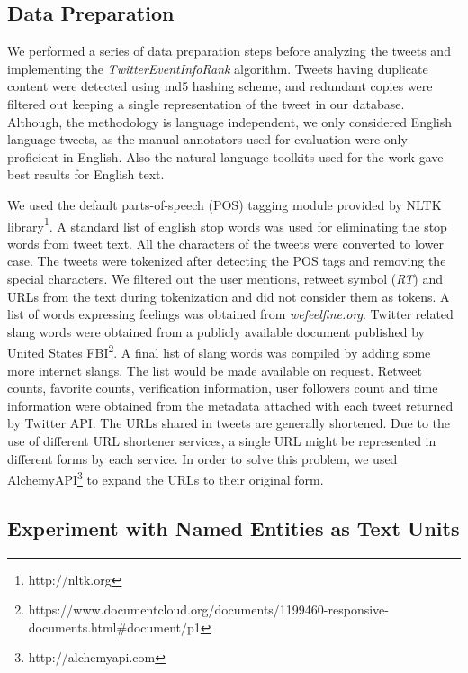 \subsection{Data Preparation\label{dataprep}}
We performed a series of data preparation steps before analyzing the tweets and implementing the \textit{TwitterEventInfoRank} algorithm.  Tweets having duplicate content were detected using md5 hashing scheme, and redundant copies were filtered out keeping a single representation of the tweet in our database. Although, the methodology is language independent,
we only considered English language tweets, as the manual annotators used for evaluation were only proficient in English. Also the natural language toolkits used for the work gave best results for English text. 

We used the default parts-of-speech (POS) tagging module provided by NLTK library\footnote{\tiny http://nltk.org}. A standard list of english stop words was used for eliminating the stop words from tweet text. All the characters of the tweets were converted to lower case. The tweets were tokenized after detecting the POS tags and removing the special characters. We filtered out the user mentions, retweet symbol (\textit{RT}) and URLs from the text during tokenization and did not consider them as tokens. A list of words expressing feelings was obtained from \textit{wefeelfine.org}. Twitter related slang words were obtained from a publicly available document published by United States FBI\footnote{\tiny https://www.documentcloud.org/documents/1199460-responsive-documents.html\#document/p1}. A final list of slang words was compiled 
by adding some more internet slangs. The list would be made available on request. Retweet counts, favorite counts, verification information, user followers count and time information were obtained from the metadata attached with each tweet returned by Twitter API. The URLs shared in tweets are generally shortened. Due to the use of different URL shortener services, a single URL might be represented in different forms by each service. In order to solve this problem, we used AlchemyAPI\footnote{\tiny http://alchemyapi.com} to expand the URLs to their original form.




\subsection{Experiment with Named Entities as Text Units}
